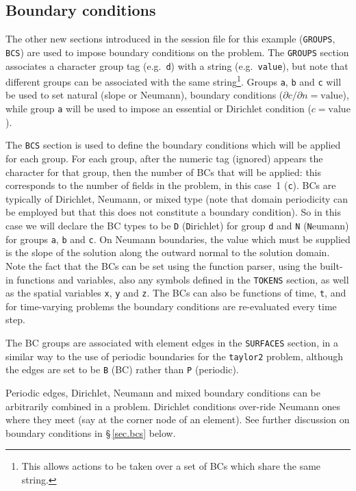 \documentclass[11pt]{report}
\newcommand{\eg}{e.g.\ } \newcommand{\CC}{\mathrm{c.c.}}
\begin{document}
\subsection{Boundary conditions}

The other new sections introduced in the session file for this example
(\texttt{GROUPS}, \texttt{BCS}) are used to impose boundary conditions
on the problem.  The \texttt{GROUPS} section associates a character
group tag (\eg \verb+d+) with a string (\eg \verb+value+), but note
that different groups can be associated with the same
string\footnote{This allows actions to be taken over a set of BCs
  which share the same string.}.  Groups \verb+a+, \verb+b+ and
\verb+c+ will be used to set natural (\ie slope or Neumann), boundary
conditions ($\partial c/\partial n=\textrm{value}$), while group
\verb+a+ will be used to impose an essential or Dirichlet condition
($c=\textrm{value}$).

The \texttt{BCS} section is used to define the boundary conditions
which will be applied for each group.  For each group, after the
numeric tag (ignored) appears the character for that group, then the
number of BCs that will be applied: this corresponds to the number of
fields in the problem, in this case~1 (\verb+c+).  BCs are typically
of Dirichlet, Neumann, or mixed type (note that domain periodicity can
be employed but that this does not constitute a boundary condition).
So in this case we will declare the BC types to be \verb+D+ ({\texttt
  D}irichlet) for group \verb+d+ and \verb+N+ ({\texttt N}eumann) for
groups \verb+a+, \verb+b+ and \verb+c+.  On Neumann boundaries, the
value which must be supplied is the slope of the solution along the
outward normal to the solution domain.  Note the fact that the BCs can
be set using the function parser, using the built-in functions and
variables, also any symbols defined in the \texttt{TOKENS} section, as
well as the spatial variables \verb+x+, \verb+y+ and \verb+z+.  The
BCs can also be functions of time, \verb+t+, and for time-varying
problems the boundary conditions are re-evaluated every time step.

The BC groups are associated with element edges in the \texttt{SURFACES}
section, in a similar way to the use of periodic boundaries for the
\texttt{taylor2} problem, although the edges are set to be \verb+B+ (BC)
rather than \verb+P+ (periodic).

Periodic edges, Dirichlet, Neumann and mixed boundary conditions can
be arbitrarily combined in a problem.  Dirichlet conditions over-ride
Neumann ones where they meet (say at the corner node of an
element). See further discussion on boundary conditions in
\S\,\ref{sec.bcs} below.
\end{document}
